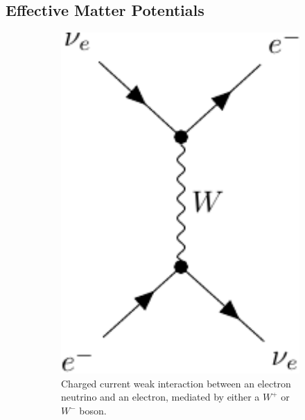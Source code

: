 \subsection{Effective Matter Potentials}

\begin{figure}
    \centering
    \begin{subfigure}{0.3\textwidth}
        \includegraphics[width=1\textwidth]{figures/w-boson.pdf} 
        \caption{Charged current weak interaction between an electron neutrino and an electron,
        mediated by either a $W^+$ or $W^-$ boson.}
    \end{subfigure}
    \quad
    \begin{subfigure}{0.3\textwidth}

\end{subfigure}
\end{figure}
